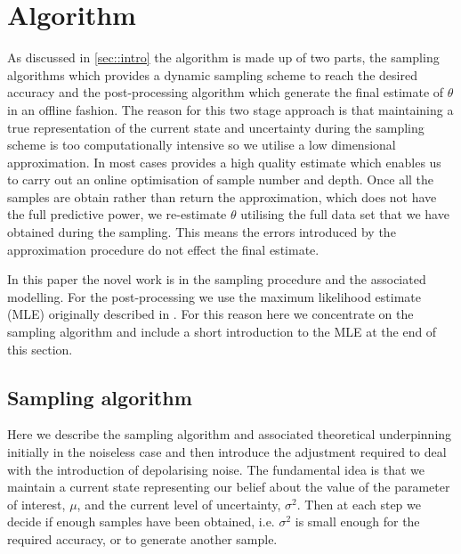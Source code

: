 
\section{Algorithm}
As discussed in \ref{sec::intro} the algorithm is made up of two parts, the sampling algorithms which provides a dynamic sampling scheme to reach the desired accuracy and the post-processing algorithm which generate the final estimate of $\theta$ in an offline fashion. The reason for this two stage approach is that maintaining a true representation of the current state and uncertainty during the sampling scheme is too computationally intensive so we utilise a low dimensional approximation. In most cases provides a high quality estimate which enables us to carry out an online optimisation of sample number and depth. Once all the samples are obtain rather than return the approximation, which does not have the full predictive power, we re-estimate $\theta$ utilising the full data set that we have obtained during the sampling. This means the errors introduced by the approximation procedure do not effect the final estimate.

In this paper the novel work is in the sampling procedure and the associated modelling. For the post-processing we use the maximum likelihood estimate (MLE) originally described in \cite{MLE}. For this reason here we concentrate on the sampling algorithm and include a short introduction to the MLE at the end of this section.

\subsection{Sampling algorithm}
Here we describe the sampling algorithm and associated theoretical underpinning initially in the noiseless case and then introduce the adjustment required to deal with the introduction of depolarising noise. The fundamental idea is that we maintain a current state representing our belief about the value of the parameter of interest, $\mu$, and the current level of uncertainty, $\sigma^2$. Then at each step we decide if enough samples have been obtained, i.e. $\sigma^2$ is small enough for the required accuracy, or to generate another sample.

